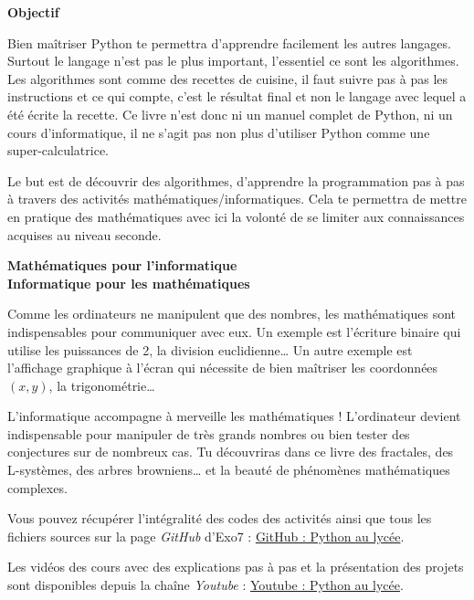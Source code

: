 \bigskip

{\large\textbf{Objectif}}

Bien maîtriser Python te permettra d'apprendre facilement les autres langages. Surtout le langage n'est pas le plus important, l'essentiel ce sont les algorithmes. Les algorithmes sont comme des recettes de cuisine, il faut suivre pas à pas les instructions et ce qui compte, c'est le résultat final et non le langage avec lequel a été écrite la recette. Ce livre n'est donc ni un manuel complet de Python, ni un cours d'informatique, il ne s'agit pas non plus d'utiliser Python comme une super-calculatrice.

Le but est de découvrir des algorithmes, d'apprendre la programmation pas à pas à travers des activités mathématiques/informatiques. Cela te permettra de mettre en pratique des mathématiques avec ici la volonté de se limiter aux connaissances acquises au niveau seconde.

\bigskip

{\large\textbf{Mathématiques pour l'informatique}}\\
{\large\textbf{Informatique pour les mathématiques}}

Comme les ordinateurs ne manipulent que des nombres, les mathématiques sont indispensables pour communiquer avec eux. Un exemple est l'écriture binaire qui utilise les puissances de 2, la division euclidienne\ldots{} Un autre exemple est l'affichage graphique à l'écran qui nécessite de bien maîtriser les  coordonnées $(x,y)$, la trigonométrie\ldots

L'informatique accompagne à merveille les mathématiques ! L'ordinateur devient indispensable pour manipuler de très grands nombres ou bien tester des conjectures sur de nombreux cas. Tu découvriras dans ce livre des fractales, des L-systèmes, des arbres browniens\ldots{} et la beauté de phénomènes mathématiques complexes.

\bigskip

\begin{center}
Vous pouvez récupérer l'intégralité des codes \Python{} des activités ainsi que tous les fichiers sources sur la page \emph{GitHub} d'Exo7 :
\href{https://github.com/exo7math}{\og{}GitHub : Python au lycée\fg{}}.

\medskip

Les vidéos des cours avec des explications pas à pas et la présentation des projets sont disponibles depuis la chaîne \emph{Youtube} :
\href{https://www.youtube.com/PythonAuLycée}{\og{}Youtube : Python au lycée\fg{}}.
\end{center}


